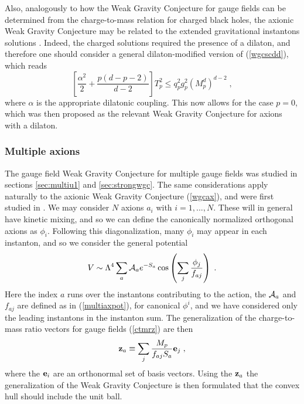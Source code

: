 \documentclass[11pt,a4paper]{article}
\numberwithin{equation}{section}
\numberwithin{table}{section}\setlength{\multlinegap}{25pt}
\newcommand{\be}{\begin{equation}}
\newcommand{\ee}{\end{equation}}
\begin{document}
Also, analogously to how the Weak Gravity Conjecture for gauge fields can be determined from the charge-to-mass relation for charged black holes, the axionic Weak Gravity Conjecture may be related to the extended gravitational instantons solutions \cite{Heidenreich:2015nta}. Indeed, the charged solutions required the presence of a dilaton, and therefore one should consider a general dilaton-modified version of (\ref{wgcscdd}), which reads \cite{Heidenreich:2015nta}
\be
\label{wgcpddm}
\left[\frac{\alpha^2}{2}+\frac{p\left(d-p-2\right)}{d-2} \right]T_p^2 \leq q_p^2 g_p^2 \left(M_p^d\right)^{d-2}\;,
\ee 
where $\alpha$ is the appropriate dilatonic coupling. This now allows for the case $p=0$, which was then proposed as the relevant Weak Gravity Conjecture for axions with a dilaton. 

\subsubsection*{Multiple axions}

The gauge field Weak Gravity Conjecture for multiple gauge fields was studied in sections \ref{sec:multiu1} and \ref{sec:strongwgc}. The same considerations apply naturally to the axionic Weak Gravity Conjecture (\ref{wgcax}), and were first studied in \cite{Rudelius:2015xta,Brown:2015iha,Bachlechner:2015qja,Hebecker:2015rya,Brown:2015lia}. We may consider $N$ axions $a_i$ with $i=1,...,N$. These will in general have kinetic mixing, and so we can define the canonically normalized orthogonal axions as $\phi_i$. Following this diagonalization, many $\phi_i$ may appear in each instanton, and so we consider the general potential
\be
\label{multiaxpot}
V \sim \Lambda^4 \sum_a {\cal A}_a e^{-S_a} \cos \left( \sum_{j} \frac{\phi_j}{f_{aj}}\right) \;.
\ee
Here the index $a$ runs over the instantons contributing to the action, the ${\cal A}_a$ and $f_{aj}$ are defined as in (\ref{multiaxpot}), for canonical $\phi^i$, and we have considered only the leading instantons in the instanton sum. 
The generalization of the charge-to-mass ratio vectors for gauge fields (\ref{ctmrz}) are then \cite{Rudelius:2015xta}
\be
{\bf z}_a \equiv \sum_j \frac{M_p}{f_{aj} S_a} {\bf e}_j\;,
\ee
where the ${\bf e}_i$ are an orthonormal set of basis vectors. Using the ${\bf z}_a$ the generalization of the Weak Gravity Conjecture is then formulated that the convex hull should include the unit ball.
\end{document}
